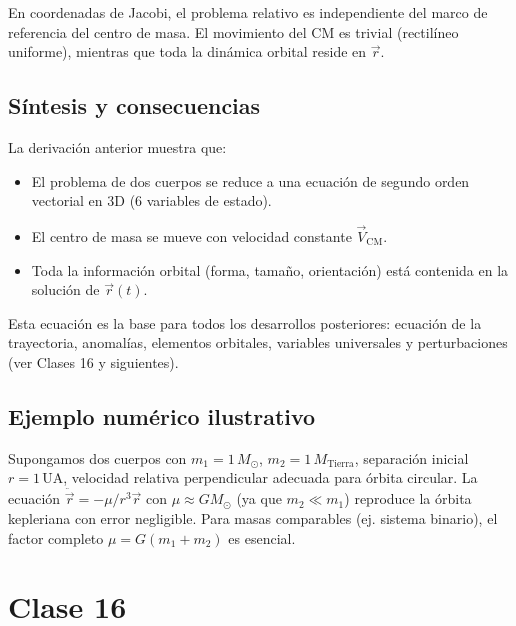 \documentclass[12pt,oneside]{book}
\begin{document}
\begin{importante}
En coordenadas de Jacobi, el problema relativo es independiente del marco de referencia del centro de masa. El movimiento del CM es trivial (rectilíneo uniforme), mientras que toda la dinámica orbital reside en \(\vec{r}\).
\end{importante}

\section{Síntesis y consecuencias}
La derivación anterior muestra que:
\begin{itemize}
    \item El problema de dos cuerpos se reduce a una ecuación de segundo orden vectorial en 3D (6 variables de estado).
    \item El centro de masa se mueve con velocidad constante \(\vec{V}_{\text{CM}}\).
    \item Toda la información orbital (forma, tamaño, orientación) está contenida en la solución de \(\vec{r}(t)\).
\end{itemize}

Esta ecuación es la base para todos los desarrollos posteriores: ecuación de la trayectoria, anomalías, elementos orbitales, variables universales y perturbaciones (ver Clases 16 y siguientes).

\section{Ejemplo numérico ilustrativo}
Supongamos dos cuerpos con \(m_1 = 1\,M_\odot\), \(m_2 = 1\,M_\text{Tierra}\), separación inicial \(r = 1\,\text{UA}\), velocidad relativa perpendicular adecuada para órbita circular. La ecuación \(\ddot{\vec{r}} = -\mu/r^3 \vec{r}\) con \(\mu \approx G M_\odot\) (ya que \(m_2 \ll m_1\)) reproduce la órbita kepleriana con error negligible. Para masas comparables (ej. sistema binario), el factor completo \(\mu = G(m_1+m_2)\) es esencial.

\chapter{Clase 16}

\backmatter
\end{document}
